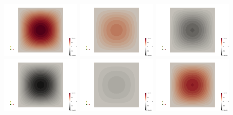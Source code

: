 \begin{center}
\includegraphics[width=4cm]{python_codes/fieldstone_165/results1/uu0000.png}
\includegraphics[width=4cm]{python_codes/fieldstone_165/results1/uu0050.png}
\includegraphics[width=4cm]{python_codes/fieldstone_165/results1/uu0100.png}\\
\includegraphics[width=4cm]{python_codes/fieldstone_165/results1/uu0150.png}
\includegraphics[width=4cm]{python_codes/fieldstone_165/results1/uu0200.png}
\includegraphics[width=4cm]{python_codes/fieldstone_165/results1/uu0249.png}
\end{center}

